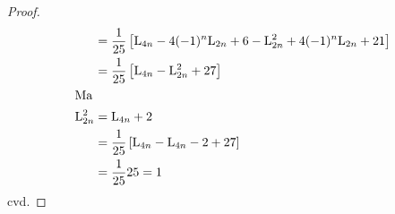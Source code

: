 \begin{proof}
\begin{align*}
		={}                   & \dfrac{1}{25}\left[\mathrm{L}_{4n}-4(-1)^n\mathrm{L}_{2n}+6-\mathrm{L}_{2n}^2+4(-1)^{n}\mathrm{L}_{2n}+21\right]                                  \\
		={}                   & \dfrac{1}{25}\left[\mathrm{L}_{4n}-\mathrm{L}_{2n}^2+27\right]                                                                      \\
		\intertext{Ma}
		\mathrm{L}_{2n}^2={}         & \mathrm{L}_{4n}+2                                                                                                            \\
		={}                   & \dfrac{1}{25}\left[\mathrm{L}_{4n}-\mathrm{L}_{4n}-2+27\right]                                                                      \\
		={}                   & \dfrac{1}{25}25=1                                                                                                     \\
	\end{align*}
	cvd.
\end{proof}
